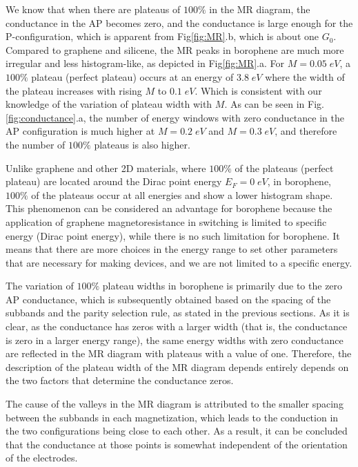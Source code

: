 \documentclass[twoside,twocolumn,9pt]{article}
\begin{document}
We know that when there are plateaus of $100\%$ in the MR diagram, the conductance in the AP becomes zero, and the conductance is large enough for the P-configuration, which is apparent from Fig\ref{fig:MR}.b, which is about one $G_0$. Compared to graphene and silicene, the MR peaks in borophene are much more irregular and less histogram-like, as depicted in Fig\ref{fig:MR}.a. For $M = 0.05\;eV$, a $100\%$ plateau (perfect plateau) occurs at an energy of $3.8\;eV$ where the width of the plateau increases with rising $M$ to $0.1\;eV$. Which is consistent with our knowledge of the variation of plateau width with $M$. As can be seen in Fig.\ref{fig:conductance}.a, the number of energy windows with zero conductance in the AP configuration is much higher at $M = 0.2\;eV$ and $M = 0.3\;eV$, and therefore the number of $100\%$ plateaus is also higher. 

Unlike graphene and other 2D materials, where $100\%$ of the plateaus (perfect plateau) are located around the Dirac point energy $E_F = 0\;eV$, in borophene, $100\%$ of the plateaus occur at all energies and show a lower histogram shape. This phenomenon can be considered an advantage for borophene because the application of graphene magnetoresistance in switching is limited to specific energy (Dirac point energy), while there is no such limitation for borophene. It means that there are more choices in the energy range to set other parameters that are necessary for making devices, and we are not limited to a specific energy. 

The variation of $100\%$ plateau widths in borophene is primarily due to the zero AP conductance, which is subsequently obtained based on the spacing of the subbands and the parity selection rule, as stated in the previous sections. As it is clear, as the conductance has zeros with a larger width (that is, the conductance is zero in a larger energy range), the same energy widths with zero conductance are reflected in the MR diagram with plateaus with a value of one. Therefore, the description of the plateau width of the MR diagram depends entirely depends on the two factors that determine the conductance zeros.

The cause of the valleys in the MR diagram is attributed to the smaller spacing between the subbands in each magnetization, which leads to the conduction in the two configurations being close to each other. As a result, it can be concluded that the conductance at those points is somewhat independent of the orientation of the electrodes.
\end{document}
